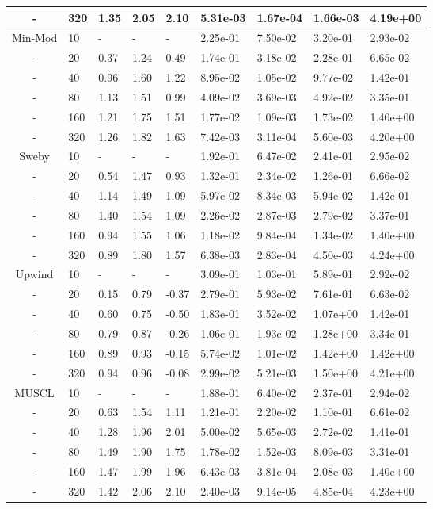 \begin{table}[p]
{\begin{tabular}{cllllllll}
     - & 320 & 1.35 & 2.05 & 2.10 & 5.31e-03 & 1.67e-04 & 1.66e-03 & 4.19e+00 \\ 
   \hline
        Min-Mod &  10 & - & - & - & 2.25e-01 & 7.50e-02 & 3.20e-01 & 2.93e-02 \\ 
        - &  20 & 0.37 & 1.24 & 0.49 & 1.74e-01 & 3.18e-02 & 2.28e-01 & 6.65e-02 \\ 
        - &  40 & 0.96 & 1.60 & 1.22 & 8.95e-02 & 1.05e-02 & 9.77e-02 & 1.42e-01 \\ 
        - &  80 & 1.13 & 1.51 & 0.99 & 4.09e-02 & 3.69e-03 & 4.92e-02 & 3.35e-01 \\ 
        - & 160 & 1.21 & 1.75 & 1.51 & 1.77e-02 & 1.09e-03 & 1.73e-02 & 1.40e+00 \\ 
        - & 320 & 1.26 & 1.82 & 1.63 & 7.42e-03 & 3.11e-04 & 5.60e-03 & 4.20e+00 \\ 
   \hline
          Sweby &  10 & - & - & - & 1.92e-01 & 6.47e-02 & 2.41e-01 & 2.95e-02 \\ 
          - &  20 & 0.54 & 1.47 & 0.93 & 1.32e-01 & 2.34e-02 & 1.26e-01 & 6.66e-02 \\ 
          - &  40 & 1.14 & 1.49 & 1.09 & 5.97e-02 & 8.34e-03 & 5.94e-02 & 1.42e-01 \\ 
          - &  80 & 1.40 & 1.54 & 1.09 & 2.26e-02 & 2.87e-03 & 2.79e-02 & 3.37e-01 \\ 
          - & 160 & 0.94 & 1.55 & 1.06 & 1.18e-02 & 9.84e-04 & 1.34e-02 & 1.40e+00 \\ 
          - & 320 & 0.89 & 1.80 & 1.57 & 6.38e-03 & 2.83e-04 & 4.50e-03 & 4.24e+00 \\ 
   \hline
         Upwind &  10 & - & - & - & 3.09e-01 & 1.03e-01 & 5.89e-01 & 2.92e-02 \\ 
         - &  20 & 0.15 & 0.79 & -0.37& 2.79e-01 & 5.93e-02 & 7.61e-01 & 6.63e-02 \\ 
         - &  40 & 0.60 & 0.75 & -0.50& 1.83e-01 & 3.52e-02 & 1.07e+00 & 1.42e-01 \\ 
         - &  80 & 0.79 & 0.87 & -0.26& 1.06e-01 & 1.93e-02 & 1.28e+00 & 3.34e-01 \\ 
         - & 160 & 0.89 & 0.93 & -0.15& 5.74e-02 & 1.01e-02 & 1.42e+00 & 1.42e+00 \\ 
         - & 320 & 0.94 & 0.96 & -0.08& 2.99e-02 & 5.21e-03 & 1.50e+00 & 4.21e+00 \\ 
   \hline
          MUSCL &  10 & - & - & - & 1.88e-01 & 6.40e-02 & 2.37e-01 & 2.94e-02 \\ 
          - &  20 & 0.63 & 1.54 & 1.11 & 1.21e-01 & 2.20e-02 & 1.10e-01 & 6.61e-02 \\ 
          - &  40 & 1.28 & 1.96 & 2.01 & 5.00e-02 & 5.65e-03 & 2.72e-02 & 1.41e-01 \\ 
          - &  80 & 1.49 & 1.90 & 1.75 & 1.78e-02 & 1.52e-03 & 8.09e-03 & 3.31e-01 \\ 
          - & 160 & 1.47 & 1.99 & 1.96 & 6.43e-03 & 3.81e-04 & 2.08e-03 & 1.40e+00 \\ 
          - & 320 & 1.42 & 2.06 & 2.10 & 2.40e-03 & 9.14e-05 & 4.85e-04 & 4.23e+00 \\
   \hline
   \end{tabular}
   }
\end{table}

